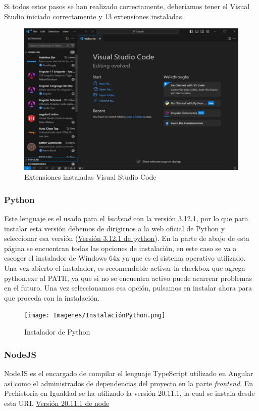 Si todos estos pasos se han realizado correctamente, deberíamos tener el Visual Studio iniciado correctamente y 13 extensiones instaladas.


\begin{figure}[h]
    \centering
    \includegraphics[width=0.75\linewidth]{Imagenes/ExtensionesVisual.png}
    \caption{Extensiones instaladas Visual Studio Code}
    \label{Extensiones instaladas Visual Studio Code}
\end{figure}
\FloatBarrier

\subsubsection{Python}

Este lenguaje es el usado para el \textit{backend} con la versión 3.12.1, por lo que para instalar esta versión debemos de dirigirnos a la web oficial de Python y seleccionar esa versión (\href{https://www.python.org/downloads/release/python-3121/}{Versión 3.12.1 de python}).
En la parte de abajo de esta página se encuentran todas las opciones de instalación, en este caso se va a escoger el instalador de Windows 64x ya que es el sistema operativo utilizado.
Una vez abierto el instalador, es recomendable activar la checkbox que agrega python.exe al PATH, ya que si no se encuentra activo puede acarrear problemas en el futuro.
Una vez seleccionamos esa opción, pulsamos en instalar ahora para que proceda con la instalación.

\begin{figure}[h]
    \centering
    \texttt{[image: Imagenes/InstalaciónPython.png]}
    \caption{Instalador de Python}
    \label{Instalador de Python}
\end{figure}
\FloatBarrier

\subsubsection{NodeJS}
NodeJS es el encargado de compilar el lenguaje TypeScript utilizado en Angular así como el administrados de dependencias del proyecto en la parte \textit{frontend}. En Prehistoria en Igualdad se ha utilizado la versión 20.11.1, la cual se instala desde esta URL \href{https://nodejs.org/en/blog/release/v20.11.1}{Versión 20.11.1 de node}

